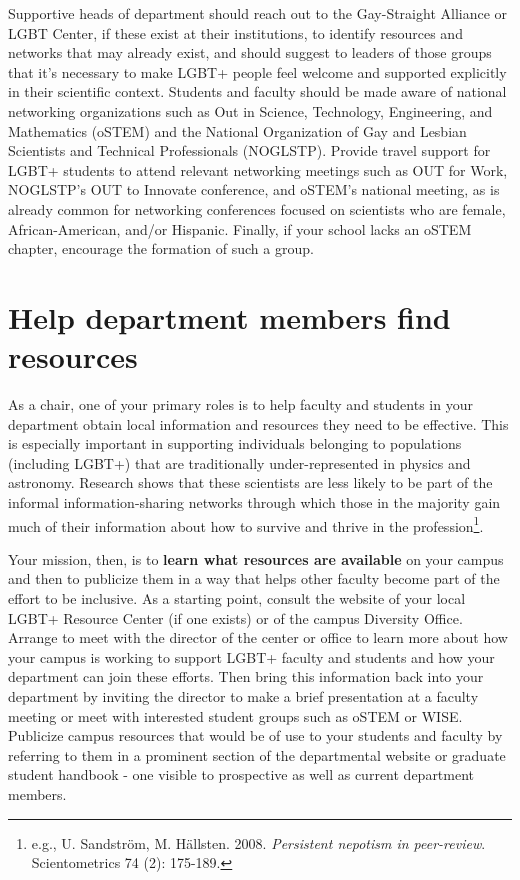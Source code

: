 Supportive heads of department should reach out to the Gay-Straight Alliance or LGBT Center, if these exist at their institutions, to identify resources and networks that may already exist, and should suggest to leaders of those groups that it's necessary to make LGBT+ people feel welcome and supported explicitly in their scientific context. Students and faculty should be made aware of national networking organizations such as Out in Science, Technology, Engineering, and Mathematics (oSTEM) and the National Organization of Gay and Lesbian Scientists and Technical Professionals (NOGLSTP). Provide travel support for LGBT+ students to attend relevant networking meetings such as OUT for Work, NOGLSTP's OUT to Innovate conference, and oSTEM's national meeting, as is already common for networking conferences focused on scientists who are female, African-American, and/or Hispanic. Finally, if your school lacks an oSTEM chapter, encourage the formation of such a group.


\section {Help department members find resources}
\label{find-resources}
As a chair, one of your primary roles is to help faculty and students in your department obtain local information and resources they need to be effective. This is especially important in supporting individuals belonging to populations (including LGBT+) that are traditionally under-represented in physics and astronomy. Research shows that these scientists are less likely to be part of the informal information-sharing networks through which those in the majority gain much of their information about how to survive and thrive in the profession\footnote{e.g., U. Sandstr\"{o}m, M. H\"{a}llsten. 2008. \emph{Persistent nepotism in peer-review}. Scientometrics 74 (2): 175-189.}.

Your mission, then, is to \textbf{learn what resources are available} on your campus and then to publicize them in a way that helps other faculty become part of the effort to be inclusive. As a starting point, consult the website of your local LGBT+ Resource Center (if one exists) or of the campus Diversity Office. Arrange to meet with the director of the center or office to learn more about how your campus is working to support LGBT+ faculty and students and how your department can join these efforts. Then bring this information back into your department by inviting the director to make a brief presentation at a faculty meeting or meet with interested student groups such as oSTEM or WISE. Publicize campus resources that would be of use to your students and faculty by referring to them in a prominent section of the departmental website or graduate student handbook - one visible to prospective as well as current department members.


